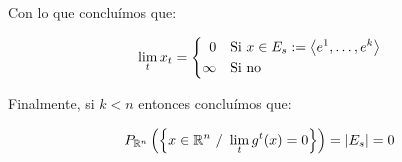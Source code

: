 \begin{example}
	Con lo que conclu\'imos que:
	
	\begin{equation*}
	\lim\limits_t x_t = \left\lbrace{
		\begin{aligned}
		0 & \quad \text{Si } x \in E_s := \left\langle e^1, \dots, e^k\right\rangle \\
		\infty & \quad \text{Si no} 
		\end{aligned}
	}\right.
	\end{equation*}
	
	Finalmente, si $k < n$ entonces conclu\'imos que:
	
	\begin{equation*}
	P_{\R^n} \left(\sett{x \in \R^n \ / \ \lim\limits_t g^t(x) = 0} \right) = \abs{E_s} = 0
	\end{equation*}
	
\end{example}

\medskip

